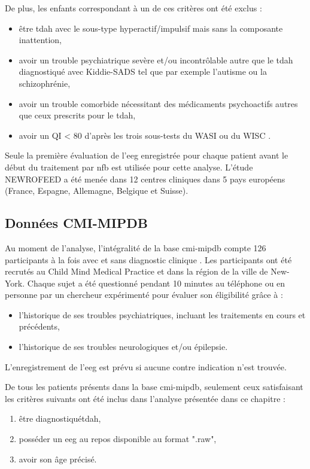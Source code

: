 De plus, les enfants correspondant à un de ces critères ont été exclus :
\begin{itemize}
\item être \gls{tdah} avec le sous-type hyperactif/impulsif mais sans la composante inattention,
\item avoir un trouble psychiatrique sevère et/ou incontrôlable autre que le \gls{tdah} diagnostiqué avec Kiddie-SADS tel que par 
exemple l'autisme ou la schizophrénie,
\item avoir un trouble comorbide nécessitant des médicaments psychoactifs autres que ceux prescrits pour le \gls{tdah},
\item avoir un QI < 80 d'après les trois sous-tests du WASI ou du WISC \citep{Wechsler1999}.
\end{itemize}

Seule la première évaluation de l'\gls{eeg} enregistrée pour chaque patient avant le début du traitement par \gls{nfb} est utilisée pour cette analyse. 
L'étude NEWROFEED a été menée dans 12 centres cliniques dans 5 pays européens (France, Espagne, Allemagne, Belgique et Suisse).

\subsection{Données CMI-MIPDB}
Au moment de l'analyse, l'intégralité de la base \gls{cmi-mipdb} compte 126 participants à la fois avec et sans diagnostic clinique \citep{Langer2017, Langer2017b}.
Les participants ont été recrutés au Child Mind Medical Practice et dans la région de la ville de New-York. Chaque sujet a été questionné pendant 10 minutes
au téléphone ou en personne par un chercheur expérimenté pour évaluer son éligibilité grâce à :
\begin{itemize}
\item l'historique de ses troubles psychiatriques, incluant les traitements en cours et précédents,
\item l'historique de ses troubles neurologiques et/ou épilepsie.
\end{itemize}

L'enregistrement de l'\gls{eeg} est prévu si aucune contre indication n'est trouvée. 

De tous les patients présents dans la base \gls{cmi-mipdb}, seulement ceux satisfaisant les critères suivants ont été inclus dans l'analyse présentée dans ce chapitre :
\begin{enumerate}
\item être diagnostiqué\gls{tdah},
\item posséder un \gls{eeg} au repos disponible au format ".raw",
\item avoir son âge précisé.
\end{enumerate}

